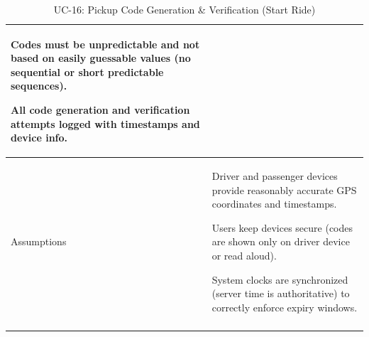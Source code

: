 \begin{longtable}{|p{3.5cm}|p{12cm}|}
Codes must be unpredictable and not based on easily guessable values (no sequential or short predictable sequences).

All code generation and verification attempts logged with timestamps and device info. \\
\hline
Assumptions &
Driver and passenger devices provide reasonably accurate GPS coordinates and timestamps.

Users keep devices secure (codes are shown only on driver device or read aloud).

System clocks are synchronized (server time is authoritative) to correctly enforce expiry windows. \\
\hline
\caption{UC-16: Pickup Code Generation \& Verification (Start Ride)}
\end{longtable}

